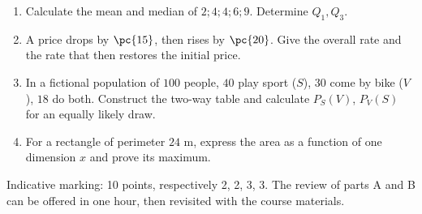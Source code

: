 \begin{example}\begin{enumerate}
\item Calculate the mean and median of $2;4;4;6;9$. Determine $Q_1,Q_3$.
\item A price drops by $\pc{15}$, then rises by $\pc{20}$. Give the overall rate and the rate that then restores the initial price.
\item In a fictional population of $100$ people, $40$ play sport ($S$), $30$ come by bike ($V$), $18$ do both. Construct the two-way table and calculate $P_S(V)$, $P_V(S)$ for an equally likely draw.
\item For a rectangle of perimeter $24$ m, express the area as a function of one dimension $x$ and prove its maximum.
\end{enumerate}\end{example}
\begin{teachernote}Indicative marking: 10 points, respectively 2, 2, 3, 3. The review of parts A and B can be offered in one hour, then revisited with the course materials.\end{teachernote}

